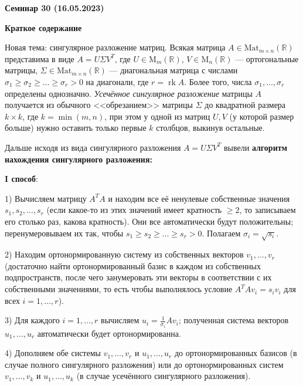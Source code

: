 \documentclass[10pt, a4paper]{extarticle}
\def \R{\mathbb{R}}
\newcommand{\rk}{\operatorname{\mathrm{rk}}}
\theoremstyle{definition}
\begin{document}
\begin{center}
\small
\noindent{}
\end{center}

\large

\begin{center}
\textbf{Семинар 30 (16.05.2023)}
\end{center}

\textbf{Краткое содержание}

Новая тема: сингулярное разложение матриц.
Всякая матрица $A \in \mathrm{Mat}_{m\times n} (\R)$ представима в виде $A = U \Sigma V^T$, где $U \in \mathrm M_m(\R)$, $V \in \mathrm M_n(\R)$ --- 
ортогональные матрицы, $\Sigma \in \mathrm{Mat}_{m \times n}(\R)$ --- диагональная матрица с числами $\sigma_1 \geqslant \sigma_2 \geqslant \ldots \geqslant \sigma_r > 0$ 
на диагонали, где $r = \rk A$. Более того, числа $\sigma_1, \ldots, \sigma_r$ определены однозначно. \textit{Усечённое сингулярное разложение} матрицы $A$ получается из 
обычного  <<обрезанием>> матрицы $\Sigma$ до квадратной размера $k \times k$, где $k = \min (m,n)$, при этом у одной из матриц $U,V$ (у которой размер больше) 
нужно оставить только первые $k$ столбцов, выкинув остальные. 

Дальше исходя из вида сингулярного разложения $A = U\Sigma V^T$ вывели \textbf{алгоритм нахождения сингулярного разложения:}

\textbf{I способ}:

1) Вычисляем матрицу $A^TA$ и находим все её ненулевые собственные значения $s_1, s_2, \ldots, s_r$ (если какое-то из этих значений имеет кратность $\geqslant 2$, 
то записываем его столько раз, какова кратность). Они все автоматически будут положительны; перенумеровываем их так, чтобы $s_1 \geqslant s_2 \geqslant \ldots \geqslant s_r > 0$. 
Полагаем $\sigma_i = \sqrt{s_i}$.

2) Находим ортонормированную систему из собственных векторов $v_1,\ldots,v_r$ (достаточно найти ортонормированный базис в каждом из собственных подпространств, 
после чего занумеровать эти векторы в соответствии с их собственными значениями, то есть чтобы выполнялось условие $A^TAv_i = s_iv_i$ для всех $i = 1,\ldots, r$).

3) Для каждого $i = 1,\ldots, r$ вычисляем $u_i = \frac1{\sigma_i}Av_i$; полученная система векторов $u_1,\ldots, u_r$ автоматически будет ортонормированна.

4) Дополняем обе системы $v_1,\ldots, v_r$ и $u_1,\ldots, u_r$ до ортонормированных базисов (в случае полного сингулярного разложения) или до ортонормированных систем 
$v_1,\ldots, v_k$ и $u_1,\ldots, u_k$ (в случае усечённого сингулярного разложения).
\end{document}
